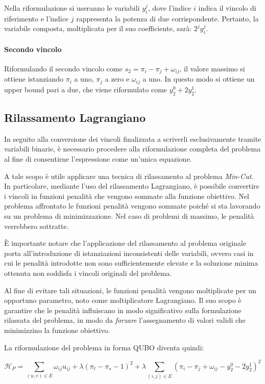 \documentclass{article}
\begin{document}
Nella riformulazione si useranno le variabili $y_i^j$, dove l'indice $i$ indica il vincolo di riferimento e l'indice $j$ rappresenta la potenza di due corrispondente. Pertanto, la variabile composta, moltiplicata per il suo coefficiente, sarà: $2^jy_i^j$.

\paragraph{Secondo vincolo} Riformulando il secondo vincolo come $s_2 = \pi_i - \pi_j + \omega_{ij}$, il valore massimo si ottiene istanziando $\pi_i$ a uno, $\pi_j$ a zero e $\omega_{ij}$ a uno. In questo modo si ottiene un upper bound pari a due, che viene riformulato come $y_2^0 + 2y_2^1$.

\subsection{Rilassamento Lagrangiano}
In seguito alla conversione dei vincoli finalizzata a scriverli esclusivamente tramite variabili binarie, è necessario procedere alla riformulazione completa del problema al fine di consentirne l'espressione come un'unica equazione.

A tale scopo è utile applicare una tecnica di rilassamento al problema \emph{Min-Cut}. In particolare, mediante l'uso del rilassamento Lagrangiano, è possibile convertire i vincoli in funzioni penalità che vengono sommate alla funzione obiettivo. Nel problema affrontato le funzioni penalità vengono sommate poiché si sta lavorando su un problema di minimizzazione. Nel caso di problemi di massimo, le penalità verrebbero sottratte.

È importante notare che l'applicazione del rilassamento al problema originale porta all'introduzione di istanziazioni inconsistenti delle variabili, ovvero casi in cui le penalità introdotte non sono sufficientemente elevate e la soluzione minima ottenuta non soddisfa i vincoli originali del problema.

Al fine di evitare tali situazioni, le funzioni penalità vengono moltiplicate per un opportuno parametro, noto come moltiplicatore Lagrangiano. Il suo scopo è garantire che le penalità influiscano in modo significativo sulla formulazione rilassata del problema, in modo da \emph{forzare} l'assegnamento di valori validi che minimizzino la funzione obiettivo.

La riformulazione del problema in forma QUBO diventa quindi:

\begin{center}
    \[\mathcal{H}_P = \sum_{(u, v) \in E} \omega_{ij}u_{ij} + \lambda(\pi_t - \pi_s - 1)^2 + \lambda\sum_{(i, j) \in E}(\pi_i - \pi_j + \omega_{ij} - y_2^0 - 2y_2^1)^2\]   
\end{center}
\end{document}
